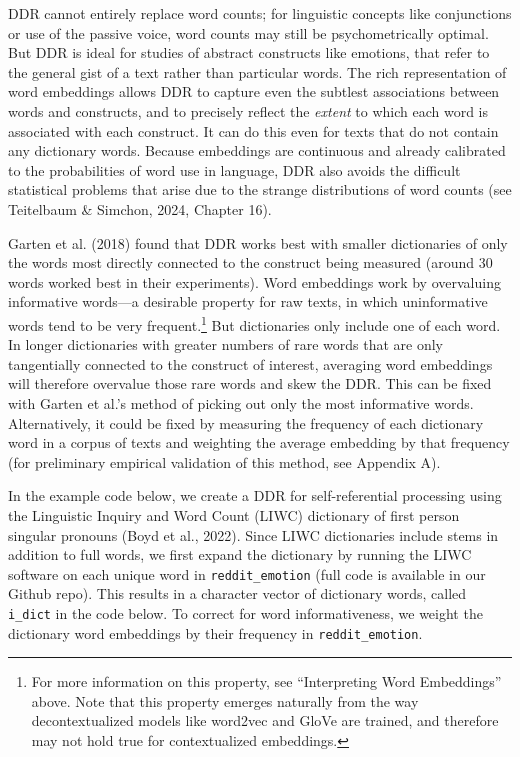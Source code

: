 \documentclass[
  man,
  floatsintext,
  longtable,
  nolmodern,
  notxfonts,
  notimes,
  colorlinks=true,linkcolor=blue,citecolor=blue,urlcolor=blue]{apa7}
\begin{document}
DDR cannot entirely replace word counts; for linguistic concepts like
conjunctions or use of the passive voice, word counts may still be
psychometrically optimal. But DDR is ideal for studies of abstract
constructs like emotions, that refer to the general gist of a text
rather than particular words. The rich representation of word embeddings
allows DDR to capture even the subtlest associations between words and
constructs, and to precisely reflect the \emph{extent} to which each
word is associated with each construct. It can do this even for texts
that do not contain any dictionary words. Because embeddings are
continuous and already calibrated to the probabilities of word use in
language, DDR also avoids the difficult statistical problems that arise
due to the strange distributions of word counts (see Teitelbaum \&
Simchon, 2024, Chapter 16).

Garten et al. (2018) found that DDR works best with smaller dictionaries
of only the words most directly connected to the construct being
measured (around 30 words worked best in their experiments). Word
embeddings work by overvaluing informative words---a desirable property
for raw texts, in which uninformative words tend to be very
frequent.\footnote{For more information on this property, see
  ``Interpreting Word Embeddings'' above. Note that this property
  emerges naturally from the way decontextualized models like word2vec
  and GloVe are trained, and therefore may not hold true for
  contextualized embeddings.} But dictionaries only include one of each
word. In longer dictionaries with greater numbers of rare words that are
only tangentially connected to the construct of interest, averaging word
embeddings will therefore overvalue those rare words and skew the DDR.
This can be fixed with Garten et al.'s method of picking out only the
most informative words. Alternatively, it could be fixed by measuring
the frequency of each dictionary word in a corpus of texts and weighting
the average embedding by that frequency (for preliminary empirical
validation of this method, see Appendix A).

In the example code below, we create a DDR for self-referential
processing using the Linguistic Inquiry and Word Count (LIWC) dictionary
of first person singular pronouns (Boyd et al., 2022). Since LIWC
dictionaries include stems in addition to full words, we first expand
the dictionary by running the LIWC software on each unique word in
\texttt{reddit\_emotion} (full code is available in our Github repo).
This results in a character vector of dictionary words, called
\texttt{i\_dict} in the code below. To correct for word informativeness,
we weight the dictionary word embeddings by their frequency in
\texttt{reddit\_emotion}.
\end{document}
